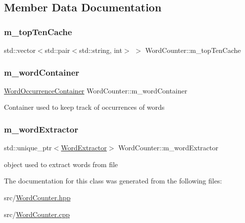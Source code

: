 \subsection{Member Data Documentation}
\mbox{\label{class_word_counter_af2184e7a0cae1bdd7a94e638dac64ed0}} 
\subsubsection{\texorpdfstring{m\+\_\+top\+Ten\+Cache}{m\_topTenCache}}
{\footnotesize\ttfamily std\+::vector$<$std\+::pair$<$std\+::string, int$>$ $>$ Word\+Counter\+::m\+\_\+top\+Ten\+Cache\hspace{0.3cm}{\ttfamily [private]}}

\mbox{\label{class_word_counter_a7f867e08264a28ccfc65972bc42e409b}} 
\subsubsection{\texorpdfstring{m\+\_\+word\+Container}{m\_wordContainer}}
{\footnotesize\ttfamily \mbox{\hyperlink{class_word_occurrence_container}{Word\+Occurrence\+Container}} Word\+Counter\+::m\+\_\+word\+Container\hspace{0.3cm}{\ttfamily [private]}}

Container used to keep track of occurrences of words \mbox{\label{class_word_counter_aefb9611fa991d6e0e7dccd64403150cb}} 
\subsubsection{\texorpdfstring{m\+\_\+word\+Extractor}{m\_wordExtractor}}
{\footnotesize\ttfamily std\+::unique\+\_\+ptr$<$\mbox{\hyperlink{class_word_extractor}{Word\+Extractor}}$>$ Word\+Counter\+::m\+\_\+word\+Extractor\hspace{0.3cm}{\ttfamily [private]}}

object used to extract words from file 

The documentation for this class was generated from the following files\+:\begin{DoxyCompactItemize}
\item 
src/\mbox{\hyperlink{_word_counter_8hpp}{Word\+Counter.\+hpp}}\item 
src/\mbox{\hyperlink{_word_counter_8cpp}{Word\+Counter.\+cpp}}\end{DoxyCompactItemize}
